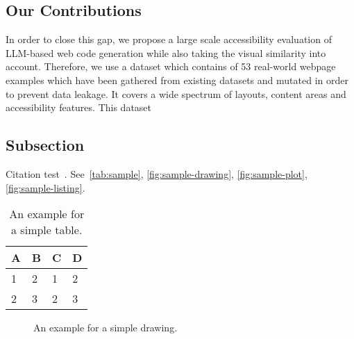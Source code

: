 \subsection{Our Contributions}
In order to close this gap, we propose a large scale accessibility evaluation of LLM-based
web code generation while also taking the visual similarity into account. Therefore,
we use a dataset which contains of 53 real-world webpage examples which have been 
gathered from existing datasets and mutated in order to prevent data leakage.
It covers a wide spectrum of layouts, content areas and accessibility features.\newline
This dataset






\subsection{Subsection}
Citation test~\parencite{latex}.
See~\autoref{tab:sample}, \autoref{fig:sample-drawing}, \autoref{fig:sample-plot}, \autoref{fig:sample-listing}.

\begin{table}[htpb]
  \caption[Example table]{An example for a simple table.}\label{tab:sample}
  \centering
  \begin{tabular}{l l l l}
    \toprule
      A & B & C & D \\
    \midrule
      1 & 2 & 1 & 2 \\
      2 & 3 & 2 & 3 \\
    \bottomrule
  \end{tabular}
\end{table}

\begin{figure}[htpb]
  \centering
  \caption[Example drawing]{An example for a simple drawing.}\label{fig:sample-drawing}
\end{figure}

